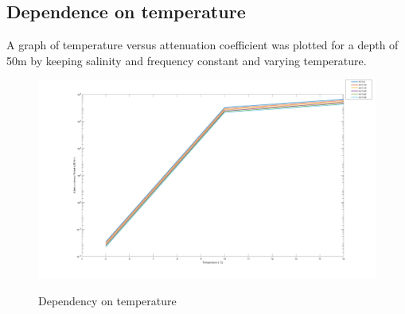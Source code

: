 \subsection{Dependence on temperature} \label{Dependence on temperature} 
\noindent A graph of temperature versus attenuation coefficient was plotted for a depth of 50m by keeping salinity and frequency constant and varying temperature.
\begin{figure}[H]
\centering
{\includegraphics[scale=0.15]{ucp2_4.png}}
\caption{Dependency on temperature}
\end{figure}





